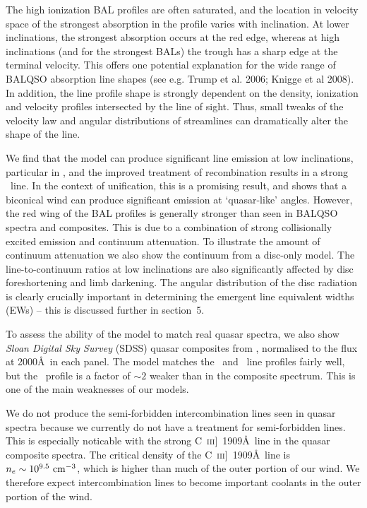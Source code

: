 \documentclass[preprint, a4paper, 11pt]{aastex}
\begin{document}
The high ionization BAL profiles are often saturated, and the location in velocity space
of the strongest absorption in the profile varies with inclination.
At lower inclinations, the strongest absorption occurs at the red edge,
whereas at high inclinations (and for the strongest BALs)
the trough has a sharp edge at the terminal velocity.
This offers one potential explanation for the wide range of BALQSO absorption
line shapes (see e.g. Trump et al. 2006; Knigge et al 2008).
In addition, the line profile shape is strongly dependent 
on the density, ionization and velocity 
profiles intersected by the line of sight. Thus, small tweaks of the velocity
law and angular distributions of streamlines can dramatically alter
the shape of the line.

We find that the model can produce significant line emission
at low inclinations, particular in \civ, 
and the improved treatment of recombination results in a strong \la\
line. In the context of unification, this is a promising result, 
and shows that a biconical wind can produce significant 
emission at `quasar-like' angles.
However, the red wing of the BAL profiles 
is generally stronger than seen in BALQSO spectra and composites.
This is due to a combination of strong collisionally excited emission
and continuum attenuation. To illustrate the amount of 
continuum attenuation we also show the continuum from a disc-only model.
The line-to-continuum ratios at low inclinations are also
significantly affected by disc foreshortening and limb darkening.
The angular distribution of the disc radiation is clearly
crucially important in determining the emergent line equivalent widths 
(EWs) -- this is discussed further in section~5.

To assess the ability of the model to match real 
quasar spectra, we also show {\sl Sloan Digital Sky Survey} (SDSS) quasar composites from
\cite{reichard2003}, normalised to the flux at 2000\AA\ in each panel.
The model matches the \civ\ and \mg\ line profiles fairly well, 
but the \la\ profile is a factor of $\sim2$ weaker than in the composite spectrum.
This is one of the main weaknesses of our models. 

We do not produce the semi-forbidden 
intercombination lines seen in quasar spectra because we
currently do not have a treatment for semi-forbidden lines.
This is especially noticable with the strong C~\textsc{iii}]~1909\AA\, 
line in the quasar composite spectra.
The critical density of the C~\textsc{iii}]~1909\AA\, line 
is $n_e\sim10^{9.5}~\rm{cm^{-3}}$, which is higher than much of the 
outer portion of our wind. We therefore expect intercombination lines
to become important coolants in the outer portion of the wind.
\end{document}
